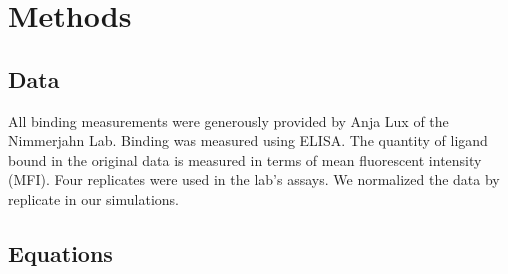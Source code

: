 \section{Methods}

\subsection{Data}

All binding measurements were generously provided by Anja Lux of the Nimmerjahn Lab. Binding was measured using ELISA. The quantity of ligand bound in the original data is measured in terms of mean fluorescent intensity (MFI). Four replicates were used in the lab's assays. We normalized the data by replicate in our simulations.

\subsection*{Equations}

